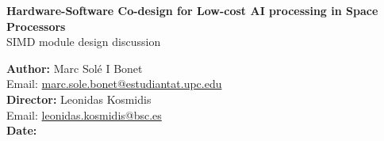 \clearpage
\begin{titlepage}
    \vspace*{\fill}
    \begin{center}
        \textbf{
        \Huge{Hardware-Software Co-design for Low-cost AI processing in Space Processors}} \\
        \LARGE{\textcolor{pantone3005}{SIMD module design discussion}} \\

    \end{center}
    \vspace*{\fill}
    \vspace*{\fill}

    \begin{flushright}
        \large
        \textcolor{pantone3005}{\textbf{Author:}} Marc Sol\'e I Bonet \\
        \textcolor{pantone3005}{Email:} \href{mailto:marc.sole.bonet@estudiantat.upc.edu}{marc.sole.bonet@estudiantat.upc.edu} \\
        \textcolor{pantone3005}{\textbf{Director:}} Leonidas Kosmidis \\
        \textcolor{pantone3005}{Email:} \href{mailto:leonidas.kosmidis@bsc.es}{leonidas.kosmidis@bsc.es} \\
        \textcolor{pantone3005}{\textbf{Date:}}  \\
    \end{flushright}
    \thispagestyle{portada}
\end{titlepage}
        
